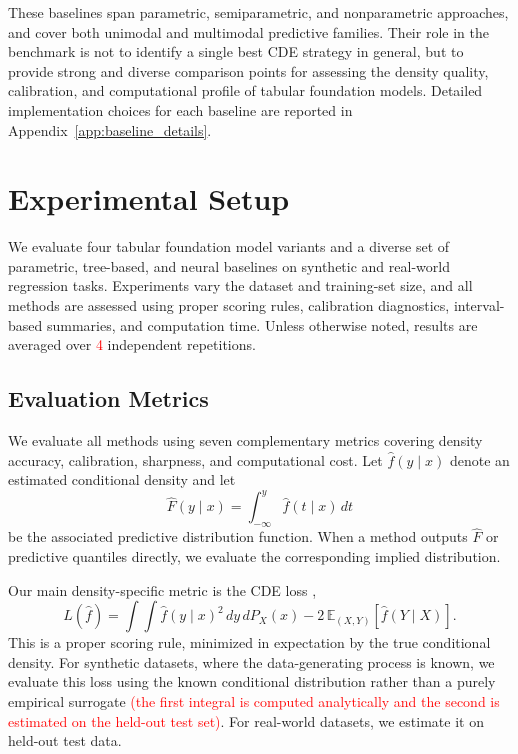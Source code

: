 \documentclass{article}
\newcommand{\E}{\mathbb{E}}
\begin{document}
These baselines span parametric, semiparametric, and nonparametric approaches,
and cover both unimodal and multimodal predictive families. Their role in the
benchmark is not to identify a single best CDE strategy in general, but to
provide strong and diverse comparison points for assessing the density quality,
calibration, and computational profile of tabular foundation models. Detailed
implementation choices for each baseline are reported in
Appendix~\ref{app:baseline_details}.

\section{Experimental Setup}
\label{sec:setup}

We evaluate four tabular foundation model variants and a diverse set of
parametric, tree-based, and neural baselines on synthetic and real-world
regression tasks. Experiments vary the dataset and training-set size, and all
methods are assessed using proper scoring rules, calibration diagnostics,
interval-based summaries, and computation time. Unless otherwise noted, results
are averaged over \textcolor{red}{4} independent repetitions.

\subsection{Evaluation Metrics}
\label{sec:metrics}

We evaluate all methods using seven complementary metrics covering density
accuracy, calibration, sharpness, and computational cost. Let $\hat f(y\mid x)$
denote an estimated conditional density and let
\begin{equation}
  \hat F(y\mid x)=\int_{-\infty}^{y}\hat f(t\mid x)\,dt
  \label{eq:estimated_cdf}
\end{equation}
be the associated predictive distribution function. When a method outputs
$\hat F$ or predictive quantiles directly, we evaluate the corresponding implied
distribution.

Our main density-specific metric is the CDE loss
\citep{izbicki2017converting},
\begin{equation}
  L(\hat f)=\int\!\!\int \hat f(y\mid x)^2\,dy\,dP_X(x)
  -2\,\E_{(X,Y)}[\hat f(Y\mid X)].
  \label{eq:cde_loss}
\end{equation}
This is a proper scoring rule, minimized in expectation by the true conditional
density. For synthetic datasets, where the data-generating process is known, we
evaluate this loss using the known conditional distribution rather than a purely
empirical surrogate \textcolor{red}{(the first integral is computed analytically and the second is estimated on the held-out test set)}. For real-world datasets, we estimate it on held-out test
data.
\end{document}
